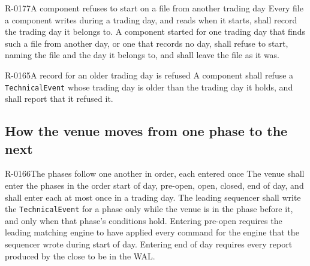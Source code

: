 \begin{requirement}{R-0177}{A component refuses to start on a file from another trading day}
  Every file a component writes during a trading day, and reads when it starts, shall record the
  trading day it belongs to. A component started for one trading day that finds such a file from
  another day, or one that records no day, shall refuse to start, naming the file and the day it
  belongs to, and shall leave the file as it was.
\end{requirement}

\begin{requirement}{R-0165}{A record for an older trading day is refused}
  A component shall refuse a \texttt{TechnicalEvent} whose trading day is older than the trading
  day it holds, and shall report that it refused it.
\end{requirement}

\subsection{How the venue moves from one phase to the next}
\label{sec:ha:technical_event:moving}

\begin{requirement}{R-0166}{The phases follow one another in order, each entered once}
  The venue shall enter the phases in the order start of day, pre-open, open, closed, end of
  day, and shall enter each at most once in a trading day. The leading sequencer shall write the
  \texttt{TechnicalEvent} for a phase only while the venue is in the phase before it, and only
  when that phase's conditions hold. Entering pre-open requires the leading matching engine to
  have applied every command for the engine that the sequencer wrote during start of day. Entering end of day
  requires every report produced by the close to be in the WAL.
\end{requirement}

